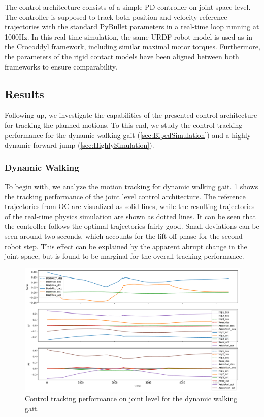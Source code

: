 The control architecture consists of a simple PD-controller on joint space level. The controller is supposed to track both position and velocity reference trajectories with the standard PyBullet parameters in a real-time loop running at 1000Hz. In this real-time simulation, the same URDF robot model is used as in the Crocoddyl framework, including similar maximal motor torques. Furthermore, the parameters of the rigid contact models have been aligned between both frameworks to ensure comparability.

\subsection{Results}
Following up, we investigate the capabilities of the presented control architecture for tracking the planned motions. To this end, we study the control tracking performance for the dynamic walking gait (\cref{sec:BipedSimulation}) and a highly-dynamic forward jump (\cref{sec:HighlySimulation}).

\subsubsection{Dynamic Walking}
To begin with, we analyze the motion tracking for dynamic walking gait. \cref{fig:walkDynamic_pybulletTracking} shows the tracking performance of the joint level control architecture. The reference trajectories from \gls{OC} are visualized as solid lines, while the resulting trajectories of the real-time physics simulation are shown as dotted lines. It can be seen that the controller follows the optimal trajectories fairly good. Small deviations can be seen around two seconds, which accounts for the lift off phase for the second robot step. This effect can be explained by the apparent abrupt change in the joint space, but is found to be marginal for the overall tracking performance. 
\begin{figure}[h!]
\centering	
\includegraphics[width=1\textwidth]{fig/walkDynamic/pybullet/pybulletTracking}
\caption{Control tracking performance on joint level for the dynamic walking gait.}
\label{fig:walkDynamic_pybulletTracking}
\end{figure}

